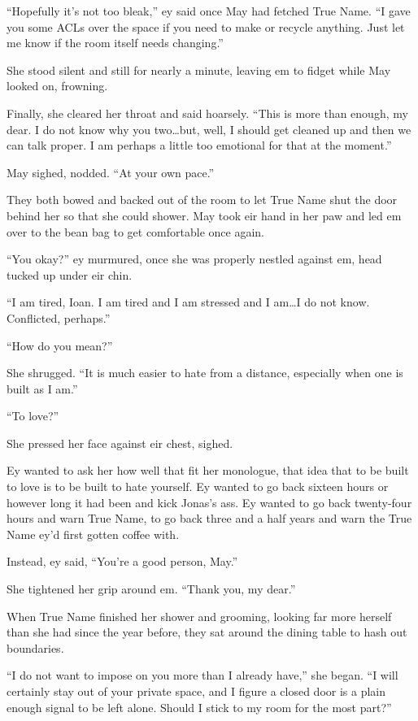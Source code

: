 ``Hopefully it's not too bleak,'' ey said once May had fetched True Name. ``I gave you some ACLs over the space if you need to make or recycle anything. Just let me know if the room itself needs changing.''

She stood silent and still for nearly a minute, leaving em to fidget while May looked on, frowning.

Finally, she cleared her throat and said hoarsely. ``This is more than enough, my dear. I do not know why you two\ldots but, well, I should get cleaned up and then we can talk proper. I am perhaps a little too emotional for that at the moment.''

May sighed, nodded. ``At your own pace.''

They both bowed and backed out of the room to let True Name shut the door behind her so that she could shower. May took eir hand in her paw and led em over to the bean bag to get comfortable once again.

``You okay?'' ey murmured, once she was properly nestled against em, head tucked up under eir chin.

``I am tired, Ioan. I am tired and I am stressed and I am\ldots I do not know. Conflicted, perhaps.''

``How do you mean?''

She shrugged. ``It is much easier to hate from a distance, especially when one is built as I am.''

``To love?''

She pressed her face against eir chest, sighed.

Ey wanted to ask her how well that fit her monologue, that idea that to be built to love is to be built to hate yourself. Ey wanted to go back sixteen hours or however long it had been and kick Jonas's ass. Ey wanted to go back twenty-four hours and warn True Name, to go back three and a half years and warn the True Name ey'd first gotten coffee with.

Instead, ey said, ``You're a good person, May.''

She tightened her grip around em. ``Thank you, my dear.''

When True Name finished her shower and grooming, looking far more herself than she had since the year before, they sat around the dining table to hash out boundaries.

``I do not want to impose on you more than I already have,'' she began. ``I will certainly stay out of your private space, and I figure a closed door is a plain enough signal to be left alone. Should I stick to my room for the most part?''

